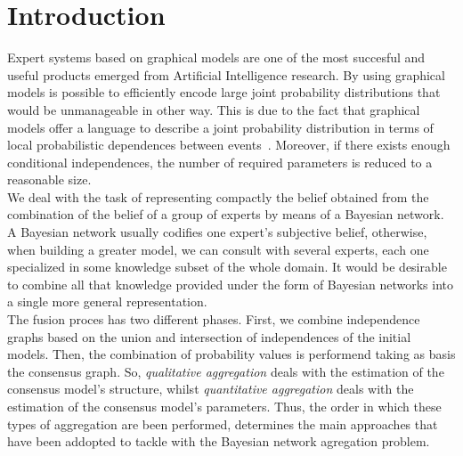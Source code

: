 \section{Introduction}
Expert systems based on graphical models are one of the most succesful and useful products 
emerged from Artificial Intelligence research. By using graphical models is possible to 
efficiently encode large joint probability distributions that would be unmanageable in other way. 
This is due to the fact that graphical models offer a language to describe a joint probability 
distribution in terms of local probabilistic dependences between events~\cite{jensen-book2001}. 
Moreover, if there exists enough conditional independences, the number of
required parameters is reduced to a reasonable size.\\

We deal with the task of representing compactly the belief obtained from the 
combination of the belief of a group of experts by means of a Bayesian network. A Bayesian network 
usually codifies one expert's subjective belief, otherwise, when building a greater model, we can 
consult with several experts, each one specialized in some knowledge subset of the whole domain. 
It would be desirable to combine all that knowledge provided under the form of Bayesian networks
into a single more general representation.\\

The fusion proces has two different phases. First, we combine independence graphs based on the 
union and intersection of independences of the initial models. Then, the combination of probability 
values is performend taking as basis the consensus graph. So, {\em qualitative aggregation} deals with 
the estimation of the consensus model's structure, whilst {\em quantitative aggregation} deals with 
the estimation of the consensus model's parameters. Thus, the order in which these types of 
aggregation are been performed, determines the main approaches that have been addopted to tackle 
with the Bayesian network agregation problem.



